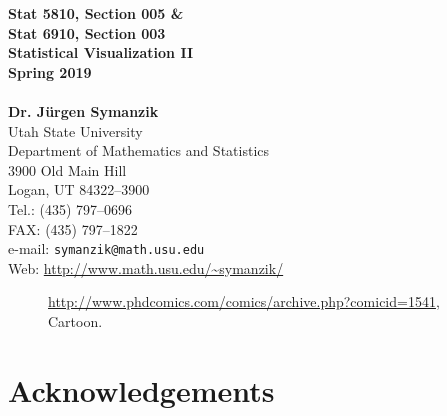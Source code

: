 \documentclass[12pt,letterpaper,final]{article}
\begin{document}





\begin{titlepage}
\vspace*{3.5cm}
\begin{center}
{\LARGE \bf Stat 5810, Section 005 \&} \\[0.5cm]
{\LARGE \bf Stat 6910, Section 003} \\[0.8cm]
{\LARGE \bf Statistical Visualization II} \\[0.5cm]
{\LARGE \bf Spring 2019} \\[0.5cm]
~ \\[2cm]
{\bf Dr. J\"urgen Symanzik} \\[0.3cm]
Utah State University \\[0.3cm]
Department of Mathematics and Statistics \\[0.3cm]
3900 Old Main Hill \\[0.3cm]
Logan, UT 84322--3900 \\[0.8cm]
Tel.: (435) 797--0696 \\[0.3cm]
FAX: (435) 797--1822 \\[0.3cm]
e-mail: \verb|symanzik@math.usu.edu| \\[0.3cm]
Web: \url{http://www.math.usu.edu/~symanzik/}
\end{center}

\thispagestyle{empty}
\vfill
\end{titlepage}

\newpage

\thispagestyle{empty}

\vspace*{5cm}

\begin{figure}[ht]
\caption{\label{PhdcomicsCom_Plotting}
\url{http://www.phdcomics.com/comics/archive.php?comicid=1541}, \\
Cartoon.
}
\end{figure}


\newpage


\setcounter{page}{1}

\tableofcontents

\newpage

%


\section*{Acknowledgements}
\end{document}
